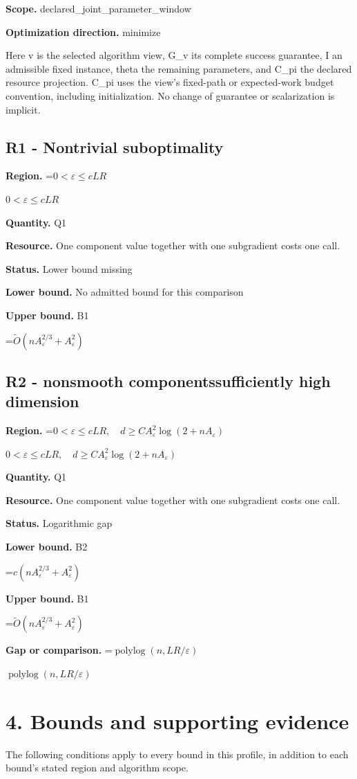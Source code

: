 \documentclass[10pt,a4paper]{article}
\newcommand{\AtlasMath}[1]{\par\begingroup\centering\setbox0=\hbox{$\displaystyle #1$}\ifdim\wd0>1.4\linewidth\typeout{ATLAS WIDE FORMULA: \the\wd0}\fi\ifdim\wd0>\linewidth\resizebox{\linewidth}{!}{\box0}\else\box0\fi\par\endgroup}
\newcommand{\AtlasInlineMath}[1]{\begingroup\setbox0=\hbox{$#1$}\ifdim\wd0>.4\linewidth\endgroup\AtlasMath{#1}\else\endgroup$#1$\fi}
\begin{document}
\textbf{Scope.} declared\_joint\_parameter\_window

\textbf{Optimization direction.} minimize

Here v is the selected algorithm view, G\_v its complete success guarantee, I an admissible fixed instance, theta the remaining parameters, and C\_pi the declared resource projection. C\_pi uses the view's fixed-path or expected-work budget convention, including initialization. No change of guarantee or scalarization is implicit.

\subsection{R1 - Nontrivial suboptimality}
\textbf{Region.} \AtlasInlineMath{0<\varepsilon\le cLR}

\textbf{Quantity.} Q1

\textbf{Resource.} One component value together with one subgradient costs one call.

\textbf{Status.} Lower bound missing

\textbf{Lower bound.} No admitted bound for this comparison

\textbf{Upper bound.} B1

\AtlasMath{\widetilde{O}(nA_\varepsilon^{2/3}+A_\varepsilon^2)}
\subsection{R2 - nonsmooth componentssufficiently high dimension}
\textbf{Region.} \AtlasInlineMath{0<\varepsilon\le cLR,\quad d\ge C A_\varepsilon^2\log(2+nA_\varepsilon)}

\textbf{Quantity.} Q1

\textbf{Resource.} One component value together with one subgradient costs one call.

\textbf{Status.} Logarithmic gap

\textbf{Lower bound.} B2

\AtlasMath{c(nA_\varepsilon^{2/3}+A_\varepsilon^2)}
\textbf{Upper bound.} B1

\AtlasMath{\widetilde{O}(nA_\varepsilon^{2/3}+A_\varepsilon^2)}
\textbf{Gap or comparison.} \AtlasInlineMath{\operatorname{polylog}(n,LR/\varepsilon)}

\section{4. Bounds and supporting evidence}
The following conditions apply to every bound in this profile, in addition to each bound's stated region and algorithm scope.
\end{document}

